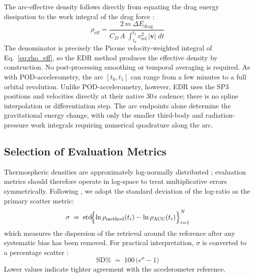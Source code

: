 \documentclass[draft]{agujournal2019}
\begin{document}
The arc-effective density follows directly from equating the drag energy
dissipation to the work integral of the drag force
\cite{Sutton2021TowardSatellites}:
\begin{equation}
\rho_{\text{eff}} = \frac{2\,m\;\Delta E_{\text{drag}}}
                         {C_D\, A \;\displaystyle\int_{t_0}^{t_1}
                          v_{\text{rel}}^2\,|\mathbf{v}|\;dt}
\end{equation}
The denominator is precisely the Picone velocity-weighted integral of
Eq.~\eqref{eq:rho_eff}, so the EDR method produces the effective density by
construction. No post-processing smoothing or temporal averaging is required.
As with POD-accelerometry, the arc $[t_0, t_1]$ can range from a few minutes
to a full orbital revolution. Unlike POD-accelerometry, however, EDR uses the
SP3 positions and velocities directly at their native 30\,s cadence; there
is no spline interpolation or differentiation step. The arc endpoints alone
determine the gravitational energy change, with only the smaller third-body
and radiation-pressure work integrals requiring numerical quadrature along
the arc.

\subsection{Selection of Evaluation Metrics}
\label{sec:metrics}

Thermospheric densities are approximately log-normally distributed
\cite{Emmert2015ThermosphericReview, Picone2005ThermosphericSets}; evaluation
metrics should therefore operate in log-space to treat multiplicative errors
symmetrically. Following , we adopt
the standard deviation of the log-ratio as the primary scatter metric:
\begin{equation}
\sigma \;=\; \operatorname{std}\!\Bigl\{
  \ln\rho_{\text{method}}(t_i) - \ln\rho_{\text{ACC}}(t_i)
\Bigr\}_{i=1}^{N}
\end{equation}
which measures the dispersion of the retrieval around the reference after any
systematic bias has been removed. For practical interpretation, $\sigma$ is
converted to a percentage scatter
\cite{Fitzpatrick2024ApplyingSatellite}:
\begin{equation}
\text{SD\%} \;=\; 100\,\bigl(e^{\sigma} - 1\bigr)
\end{equation}
Lower values indicate tighter agreement with
the accelerometer reference.
\end{document}
